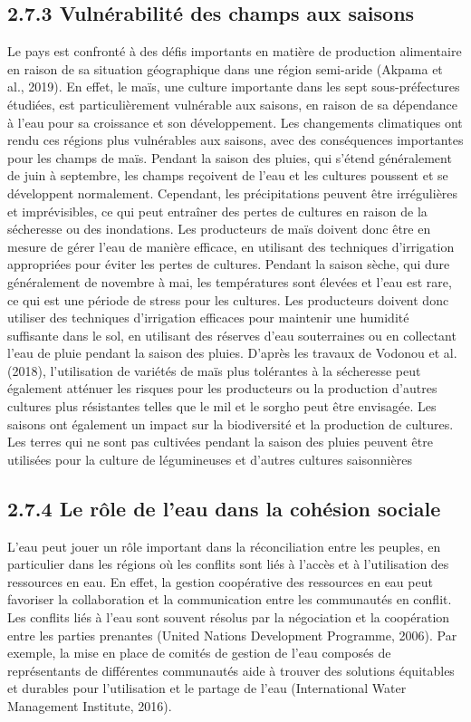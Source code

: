 \documentclass[12pt,oneside]{report}
\begin{document}
\subsection{2.7.3 Vulnérabilité des champs aux saisons}
Le pays est confronté à des défis importants en matière de production alimentaire en raison de sa situation géographique dans une région semi-aride (Akpama et al., 2019). En effet, le maïs, une culture importante dans les sept sous-préfectures étudiées, est particulièrement vulnérable aux saisons, en raison de sa dépendance à l'eau pour sa croissance et son développement. Les changements climatiques ont rendu ces régions plus vulnérables aux saisons, avec des conséquences importantes pour les champs de maïs. Pendant la saison des pluies, qui s'étend généralement de juin à septembre, les champs reçoivent de l'eau et les cultures poussent et se développent normalement. Cependant, les précipitations peuvent être irrégulières et imprévisibles, ce qui peut entraîner des pertes de cultures en raison de la sécheresse ou des inondations. Les producteurs de maïs doivent donc être en mesure de gérer l'eau de manière efficace, en utilisant des techniques d'irrigation appropriées pour éviter les pertes de cultures. Pendant la saison sèche, qui dure généralement de novembre à mai, les températures sont élevées et l'eau est rare, ce qui est une période de stress pour les cultures. Les producteurs doivent donc utiliser des techniques d'irrigation efficaces pour maintenir une humidité suffisante dans le sol, en utilisant des réserves d'eau souterraines ou en collectant l'eau de pluie pendant la saison des pluies. D’après les travaux de Vodonou et al. (2018), l'utilisation de variétés de maïs plus tolérantes à la sécheresse peut également atténuer les risques pour les producteurs ou la production d'autres cultures plus résistantes telles que le mil et le sorgho peut être envisagée. Les saisons ont également un impact sur la biodiversité et la production de cultures. Les terres qui ne sont pas cultivées pendant la saison des pluies peuvent être utilisées pour la culture de légumineuses et d'autres cultures saisonnières

\subsection{2.7.4 Le rôle de l’eau dans la cohésion sociale}
L'eau peut jouer un rôle important dans la réconciliation entre les peuples, en particulier dans les régions où les conflits sont liés à l'accès et à l'utilisation des ressources en eau. En effet, la gestion coopérative des ressources en eau peut favoriser la collaboration et la communication entre les communautés en conflit. Les conflits liés à l'eau sont souvent résolus par la négociation et la coopération entre les parties prenantes (United Nations Development Programme, 2006). Par exemple, la mise en place de comités de gestion de l'eau composés de représentants de différentes communautés aide à trouver des solutions équitables et durables pour l'utilisation et le partage de l'eau (International Water Management Institute, 2016).
\end{document}
